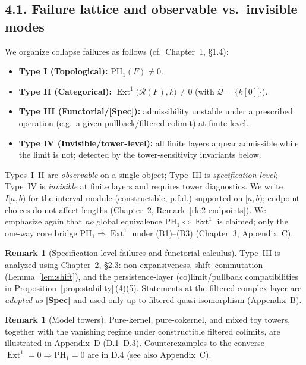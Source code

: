 \documentclass[11pt]{article}
\numberwithin{equation}{section}
\theoremstyle{plain}
\theoremstyle{definition}
\theoremstyle{remark}
\DeclareMathOperator{\Ext}{Ext}
\theoremstyle{plain}
\theoremstyle{definition}
\numberwithin{equation}{section}
\theoremstyle{definition}
\newtheorem{remark}[theorem]{Remark}
\numberwithin{equation}{section}
\theoremstyle{plain}
\theoremstyle{definition}
\theoremstyle{remark}
\begin{document}
\subsection*{4.1. Failure lattice and observable vs.\ invisible modes}
We organize collapse failures as follows (cf.\ Chapter~1, §1.4):

\begin{itemize}
  \item \textbf{Type I (Topological):} $\mathrm{PH}_1(F)\neq 0$.
  \item \textbf{Type II (Categorical):} $\Ext^1\!\big(\mathcal{R}(F),k\big)\neq 0$ (with $\mathcal{Q}=\{k[0]\}$).
  \item \textbf{Type III (Functorial/[Spec]):} admissibility unstable under a prescribed operation (e.g.\ a given pullback/filtered colimit) at finite level.
  \item \textbf{Type IV (Invisible/tower-level):} all finite layers appear admissible while the limit is not; detected by the tower-sensitivity invariants below.
\end{itemize}

Types~I–II are \emph{observable} on a single object; Type~III is \emph{specification-level}; Type~IV is \emph{invisible} at finite layers and requires tower diagnostics. We write $I[a,b)$ for the interval module (constructible, p.f.d.) supported on $[a,b)$; endpoint choices do not affect lengths (Chapter~2, Remark~\ref{rk:2-endpoints}). We emphasize again that \emph{no} global equivalence $\mathrm{PH}_1\Leftrightarrow \Ext^1$ is claimed; only the one-way core bridge $\mathrm{PH}_1\Rightarrow \Ext^1$ under \textup{(B1)–(B3)} (Chapter~3; Appendix~C).

\begin{remark}[Specification-level failures and functorial calculus]
Type~III is analyzed using Chapter~2, §2.3: non-expansiveness, shift–commutation (Lemma~\ref{lem:shift}), and the persistence-layer (co)limit/pullback compatibilities in Proposition~\ref{prop:stability}\,(4)(5). Statements at the filtered-complex layer are \emph{adopted as} \textbf{[Spec]} and used only up to filtered quasi-isomorphism (Appendix~B).
\end{remark}

\begin{remark}[Model towers]
Pure-kernel, pure-cokernel, and mixed toy towers, together with the vanishing regime under constructible filtered colimits, are illustrated in Appendix~D (D.1–D.3). Counterexamples to the converse $\Ext^1{=}0 \Rightarrow \mathrm{PH}_1{=}0$ are in D.4 (see also Appendix~C).
\end{remark}
\end{document}

